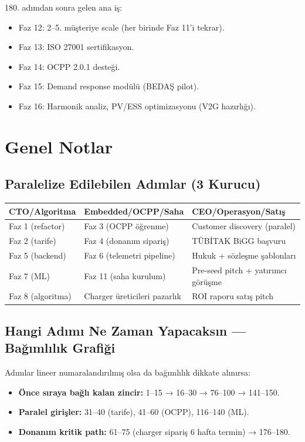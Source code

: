 \documentclass[11pt,a4paper]{article}
\begin{document}
180. adımdan sonra gelen ana iş:
\begin{itemize}
    \item Faz 12: 2--5. müşteriye scale (her birinde Faz 11'i tekrar).
    \item Faz 13: ISO 27001 sertifikasyon.
    \item Faz 14: OCPP 2.0.1 desteği.
    \item Faz 15: Demand response modülü (BEDAŞ pilot).
    \item Faz 16: Harmonik analiz, PV/ESS optimizasyonu (V2G hazırlığı).
\end{itemize}

\section{Genel Notlar}

\subsection{Paralelize Edilebilen Adımlar (3 Kurucu)}

\begin{tabularx}{\textwidth}{X X X}
\toprule
\textbf{CTO/Algoritma} & \textbf{Embedded/OCPP/Saha} & \textbf{CEO/Operasyon/Satış} \\
\midrule
Faz 1 (refactor) & Faz 3 (OCPP öğrenme) & Customer discovery (paralel) \\
Faz 2 (tarife) & Faz 4 (donanım sipariş) & TÜBİTAK BiGG başvuru \\
Faz 5 (backend) & Faz 6 (telemetri pipeline) & Hukuk + sözleşme şablonları \\
Faz 7 (ML) & Faz 11 (saha kurulum) & Pre-seed pitch + yatırımcı görüşme \\
Faz 8 (algoritma) & Charger üreticileri pazarlık & ROI raporu satış pitch \\
\bottomrule
\end{tabularx}

\subsection{Hangi Adımı Ne Zaman Yapacaksın --- Bağımlılık Grafiği}

Adımlar lineer numaralandırılmış olsa da bağımlılık dikkate alınırsa:
\begin{itemize}
    \item \textbf{Önce sıraya bağlı kalan zincir:} 1--15 → 16--30 → 76--100 → 141--150.
    \item \textbf{Paralel girişler:} 31--40 (tarife), 41--60 (OCPP), 116--140 (ML).
    \item \textbf{Donanım kritik path:} 61--75 (charger sipariş 6 hafta termin) → 176--180.
\end{itemize}
\end{document}
